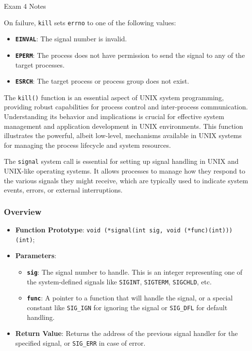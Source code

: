 \begin{examnotes}{Exam 4 Notes}
\begin{highlight}
        On failure, \texttt{kill} sets \texttt{errno} to one of the following values:

        \begin{itemize}
            \item \textbf{\texttt{EINVAL}}: The signal number is invalid.
            \item \textbf{\texttt{EPERM}}: The process does not have permission to send the signal to any of the target processes.
            \item \textbf{\texttt{ESRCH}}: The target process or process group does not exist.
        \end{itemize}

        The \texttt{kill()} function is an essential aspect of UNIX system programming, providing robust capabilities for process control and inter-process communication. Understanding its behavior 
        and implications is crucial for effective system management and application development in UNIX environments. This function illustrates the powerful, albeit low-level, mechanisms available 
        in UNIX systems for managing the process lifecycle and system resources.
    \end{highlight}

    \begin{highlight}
        The \texttt{signal} system call is essential for setting up signal handling in UNIX and UNIX-like operating systems. It allows processes to manage how they respond to the various signals they 
        might receive, which are typically used to indicate system events, errors, or external interruptions.

        \subsubsection*{Overview}

        \begin{itemize}
            \item \textbf{Function Prototype}: \texttt{void (*signal(int sig, void (*func)(int)))(int)};
            \item \textbf{Parameters}:
            \begin{itemize}
                \item \textbf{\texttt{sig}}: The signal number to handle. This is an integer representing one of the system-defined signals like \texttt{SIGINT}, \texttt{SIGTERM}, \texttt{SIGCHLD}, etc.
                \item \textbf{\texttt{func}}: A pointer to a function that will handle the signal, or a special constant like \texttt{SIG\_IGN} for ignoring the signal or \texttt{SIG\_DFL} for default handling.
            \end{itemize}
            \item \textbf{Return Value}: Returns the address of the previous signal handler for the specified signal, or \texttt{SIG\_ERR} in case of error.
        \end{itemize}


\end{highlight}
\end{examnotes}
